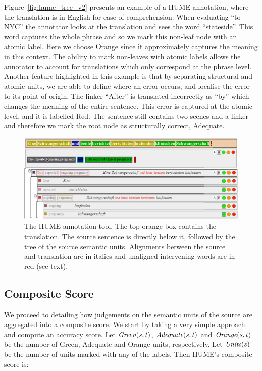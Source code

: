\documentclass[11pt,letterpaper]{article}
\def\func#1{\text{\it #1}}  %
\def\Adequate{\func{Adequate}}
\def\Green{\func{Green}}
\def\Orange{\func{Orange}}
\def\Units{\func{Units}}
\begin{document}
Figure~\ref{fig:hume_tree_v2} presents an example of a HUME
annotation, where the translation is in English for ease of comprehension.
When evaluating ``to NYC'' the annotator looks at the translation and sees the
word ``stateside''. This word captures the whole phrase and so we mark this
non-leaf node with an atomic label. Here we choose Orange since
it approximately captures the meaning in this context.
The ability to mark non-leaves with atomic labels allows
the annotator to account for translations which only correspond at the phrase
level. Another feature highlighted in this example is that by separating structural
and atomic units, we are able to define where an error occurs, and localise
the error to its point of origin. The linker ``After'' is translated incorrectly as ``by''
which changes the meaning of the entire sentence. This error is captured at
the atomic level, and it is labelled Red. The sentence still contains two scenes and
a linker and therefore we mark the root node as structurally correct, Adequate.

\begin{figure}[t]
    \begin{center}
    \includegraphics[width=.8\textwidth]{hume_interface2.jpg}
    \caption{The HUME annotation tool. The top orange box
      contains the translation. The source sentence is directly below it, followed by the tree of the source
      semantic units. Alignments between the source and translation are in italics and
      unaligned intervening words are in red (see text).}
    \label{fig:interface}
    \end{center}
\end{figure}


\subsection{Composite Score}\label{sec:score}

We proceed to detailing how judgements on the semantic units
of the source are aggregated into a composite score. 
We start by taking a very simple approach and compute an accuracy score.
Let $\Green(s,t)$, $\Adequate(s,t)$ and $\Orange(s,t)$ be the number of Green, Adequate and Orange
units, respectively. Let $\Units(s)$ be the number of units marked with any of the labels.
Then HUME's composite score is:
\end{document}
